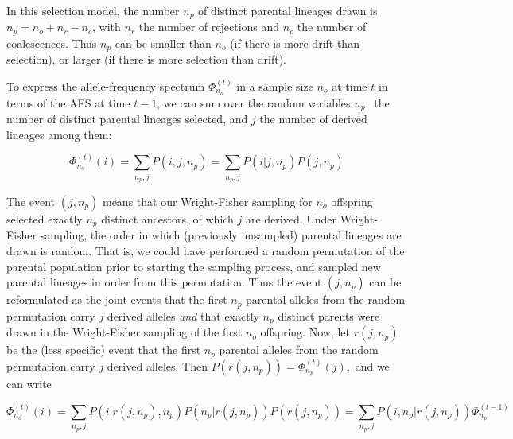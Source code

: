 \documentclass[review]{elsarticle}
\newcommand{\afs}[2]{\Phi_{#1}^{(#2)}}
\begin{document}

In this selection model, the number $n_p$ of distinct parental lineages drawn
is $n_p = n_o+n_r-n_c$, with $n_r$ the number of rejections and $n_c$ the
number of coalescences.  Thus $n_p$ can be smaller than $n_o$ (if there is more
drift than selection), or larger (if there is more selection than drift). 

To express the allele-frequency spectrum $\afs{n_o}{t}$ in a sample size $n_o$
at time $t$ in terms of the AFS at time $t-1$, we can sum over the random variables $n_p,$ the number of distinct
parental lineages selected, and $j$ the number of derived lineages among them:

\begin{equation}
\afs{n_o}{t}(i)=\sum_{n_p,j} P(i,j,n_p) = 
 \sum_{n_p,j} P(i | j,n_p) P(j,n_p)
\end{equation}

The event $(j,n_p)$ means that our Wright-Fisher sampling for $n_o$ offspring
selected exactly $n_p$ distinct ancestors, of which $j$ are derived. Under
Wright-Fisher sampling, the order in which (previously unsampled) parental
lineages are drawn is random. That is, we could have performed a random
permutation of the parental population prior to starting the sampling process,
and sampled new parental lineages in order from this permutation. Thus the
event $(j,n_p)$ can be reformulated as the joint events that the first $n_p$
parental alleles from the random permutation carry $j$ derived alleles
\textit{and} that exactly $n_p$ distinct parents were drawn in the
Wright-Fisher sampling of the first $n_o$ offspring. Now, let $r(j,n_p)$ be the
(less specific) event that the first $n_p$ parental alleles from the random
permutation carry $j$ derived alleles. Then $P(r(j,n_p)) =\afs{n_p}{t} (j),$
and we can write

\begin{equation}
\afs{n_o}{t}(i) = \sum_{n_p,j} P(i | r(j,n_p), n_p)  P(n_p | r(j,n_p) ) P(r(j,n_p)) 
    = \sum_{n_p,j} P(i,n_p | r(j,n_p))  \afs{n_p}{t-1}
\end{equation}
\end{document}
